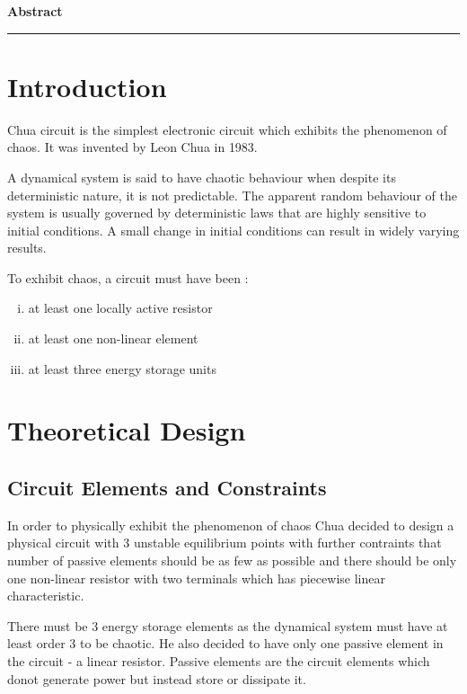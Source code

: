 \documentclass[12pt]{article}
\begin{document}
\newpage
{}
\begin{center}
	\textbf{\Large Abstract} \linebreak
	\blindtext[0]
\end{center}
\rule{17cm}{1pt}

\section{Introduction}
Chua circuit is the simplest electronic circuit which exhibits the phenomenon of chaos. It was invented by Leon Chua in 1983.
\linebreak

A dynamical system is said to have chaotic behaviour when despite its deterministic nature, it is not predictable. The apparent random behaviour of the system is usually governed by deterministic laws that are highly sensitive to initial conditions. A small change in initial conditions can result in widely varying results.
\linebreak

To exhibit chaos, a circuit must have been :
\begin{enumerate}[i.)]
	\item at least one locally active resistor
	\item at least one non-linear element
	\item at least three energy storage units
\end{enumerate}
\section{Theoretical Design}
\subsection{Circuit Elements and Constraints}
In order to physically exhibit the phenomenon of chaos Chua decided to design a physical circuit with 3 unstable equilibrium points with further contraints that number of passive elements should be as few as possible and there should be only one non-linear resistor with two terminals which has piecewise linear characteristic. \linebreak

There must be 3 energy storage elements as the dynamical system must have at least order 3 to be chaotic. He also decided to have only one passive element in the circuit - a linear resistor. \linebreak
Passive elements are the circuit elements which donot generate power but instead store or dissipate it. \linebreak
\end{document}
